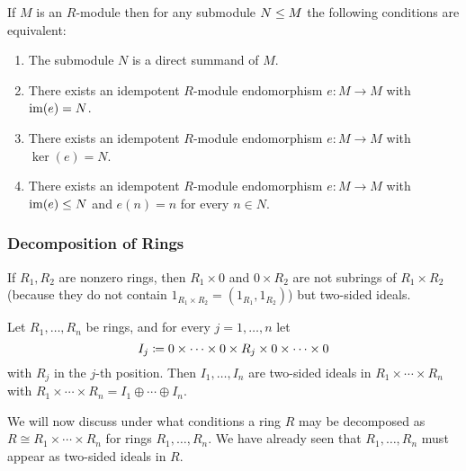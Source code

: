 

\begin{corollary}
  If $M$ is an $R$-module then for any submodule $N \leq M$ the following conditions are equivalent:
  \begin{enumerate}
    \item
      The submodule $N$ is a direct summand of $M$.
    \item
      There exists an idempotent $R$-module endomorphism $e \colon M \to M$ with $\operatorname{im}(e) = N$.
    \item
      There exists an idempotent $R$-module endomorphism $e \colon M \to M$ with $\ker(e) = N$.
    \item
      There exists an idempotent $R$-module endomorphism $e \colon M \to M$ with $\operatorname{im}(e) \leq N$ and $e(n) = n$ for every $n \in N$.
  \end{enumerate}
\end{corollary}





\subsubsection{Decomposition of Rings}


\begin{fluff}
  If $R_1, R_2$ are nonzero rings, then $R_1 \times 0$ and $0 \times R_2$ are not subrings of $R_1 \times R_2$ (because they do not contain $1_{R_1 \times R_2} = (1_{R_1}, 1_{R_2})$) but two-sided ideals.
\end{fluff}


\begin{lemma}
  Let $R_1, \dotsc, R_n$ be rings, and for every $j = 1, \dotsc, n$ let
  \[
              I_j
    \coloneqq  0 \times \dotsb \times 0 \times R_j \times 0 \times \dotsb \times 0
  \]
  with $R_j$ in the $j$-th position.
  Then $I_1, \dotsc, I_n$ are two-sided ideals in $R_1 \times \dotsb \times R_n$ with $R_1 \times \dotsb \times R_n = I_1 \oplus \dotsb \oplus I_n$.
\end{lemma}




\begin{fluff}
  We will now discuss under what conditions a ring $R$ may be decomposed as $R \cong R_1 \times \dotsb \times R_n$ for rings $R_1, \dotsc, R_n$.
  We have already seen that $R_1, \dotsc, R_n$ must appear as two-sided ideals in $R$.
\end{fluff}


